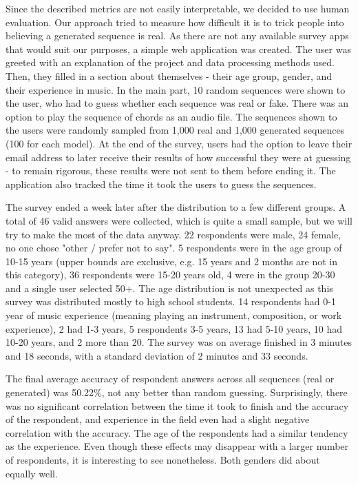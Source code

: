 \documentclass{article}
\begin{document}
Since the described metrics are not easily interpretable, we decided to use human evaluation. Our approach tried to measure how difficult it is to trick people into believing a generated sequence is real. As there are not any available survey apps that would suit our purposes, a simple web application was created. The user was greeted with an explanation of the project and data processing methods used. Then, they filled in a section about themselves - their age group, gender, and their experience in music. In the main part, 10 random sequences were shown to the user, who had to guess whether each sequence was real or fake. There was an option to play the sequence of chords as an audio file. The sequences shown to the users were randomly sampled from 1,000 real and 1,000 generated sequences (100 for each model). At the end of the survey, users had the option to leave their email address to later receive their results of how successful they were at guessing - to remain rigorous, these results were not sent to them before ending it. The application also tracked the time it took the users to guess the sequences.

The survey ended a week later after the distribution to a few different groups. A total of 46 valid answers were collected, which is quite a small sample, but we will try to make the most of the data anyway. 22 respondents were male, 24 female, no one chose "other / prefer not to say". 5 respondents were in the age group of 10-15 years (upper bounds are exclusive, e.g. 15 years and 2 months are not in this category), 36 respondents were 15-20 years old, 4 were in the group 20-30 and a single user selected 50+. The age distribution is not unexpected as this survey was distributed mostly to high school students. 14 respondents had 0-1 year of music experience (meaning playing an instrument, composition, or work experience), 2 had 1-3 years, 5 respondents 3-5 years, 13 had 5-10 years, 10 had 10-20 years, and 2 more than 20. The survey was on average finished in 3 minutes and 18 seconds, with a standard deviation of 2 minutes and 33 seconds.

The final average accuracy of respondent answers across all sequences (real or generated) was 50.22\%, not any better than random guessing. Surprisingly, there was no significant correlation between the time it took to finish and the accuracy of the respondent, and experience in the field even had a slight negative correlation with the accuracy. The age of the respondents had a similar tendency as the experience. Even though these effects may disappear with a larger number of respondents, it is interesting to see nonetheless. Both genders did about equally well.
\end{document}
